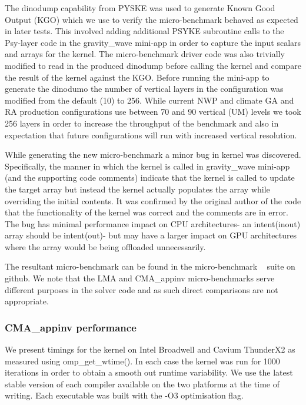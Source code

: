 The dinodump capability from PYSKE was used to generate Known Good Output (KGO) which we use to verify the micro-benchmark behaved as expected in later tests.
This involved adding additional PSYKE subroutine calls to the Psy-layer code in the gravity\_wave mini-app in order to capture the input scalars and arrays for the kernel.
The micro-benchmark driver code was also trivially modified to read in the produced dinodump before calling the kernel and compare the result of the kernel against the KGO.
Before running the mini-app to generate the dinodumo the number of vertical layers in the configuration was modified from the default (10) to 256.
While current NWP and climate GA and RA production configurations use between 70 and 90 vertical (UM) levels we took 256 layers in order to increase the throughput of the benchmark and also in expectation that future configurations will run with increased vertical resolution.


While generating the new micro-benchmark a minor bug in kernel was discovered.
Specifically, the manner in which the kernel is called in gravity\_wave mini-app (and the supporting code comments) indicate that the kernel is called to update the target array but instead the kernel actually populates the array while overriding the initial contents.
It was confirmed by the original author of the code that the functionality of the kernel was correct and the comments are in error.
The bug has minimal performance impact on CPU architectures- an intent(inout) array should be intent(out)- but may have a larger impact on GPU architectures where the array would be being offloaded unnecessarily. 

The resultant micro-benchmark can be found in the micro-benchmark ~\cite{lfric-microbenchmarks} suite on github.
We note that the LMA and CMA\_appinv micro-benchmarks serve different purposes in the solver code and as such direct comparisons are not appropriate.

\subsubsection{CMA\_appinv performance}

We present timings for the kernel on Intel Broadwell and Cavium ThunderX2 as measured using omp\_get\_wtime().
In each case the kernel was run for 1000 iterations in order to obtain a smooth out runtime variability.
We use the latest stable version of each compiler available on the two platforms at the time of writing.
Each executable was built with the -O3 optimisation flag.

